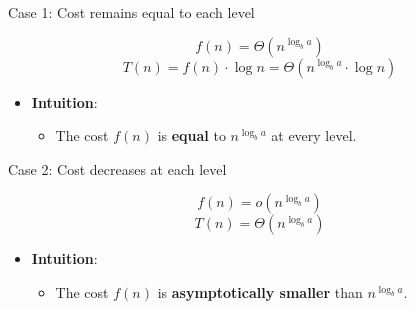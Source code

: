 \begin{frame}{Case 1: Cost remains equal to each level}

\begin{block}{}
\[
f(n) = \Theta(n^{\log_b a})
\]
\[
T(n) = f(n) \cdot \log n = \Theta(n^{\log_b a} \cdot \log n)
\]
\end{block}

\begin{itemize}
    \item \textbf{Intuition}:
    \begin{itemize}
            \item The cost \( f(n) \) is \textbf{equal} to \( n^{\log_b a} \) at every level.


    \end{itemize}
\end{itemize}

\end{frame}

\begin{frame}{Case 2: Cost decreases at each level}

\begin{block}{}
\[
f(n) = o(n^{\log_b a})
\]
\[
T(n) = \Theta(n^{\log_b a})
\]
\end{block}

\begin{itemize}
    \item \textbf{Intuition}:
    \begin{itemize}
        \item The cost \( f(n) \) is \textbf{asymptotically smaller} than \( n^{\log_b a} \).
    \end{itemize}
\end{itemize}

\end{frame}

